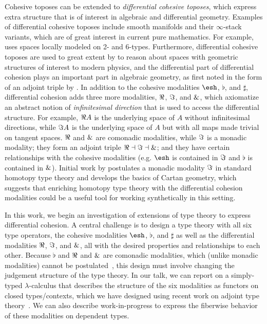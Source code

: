 \documentclass{article}
\begin{document}
Cohesive toposes can be extended to \emph{differential cohesive
  toposes}, which express extra structure that is of interest in
algebraic and differential geometry.  Examples of differential cohesive
toposes include smooth manifolds and their $\infty$-stack variants,
which are of great interest in current pure mathematics. For example,
\citet{SatiSchreiberStasheff2012} uses spaces locally modeled on 2- and
6-types.  Furthermore, differential cohesive toposes are used to great
extent by \citet{Schreiber2013} to reason about spaces with geometric
structures of interest to modern physics, and the differential part of
differential cohesion plays an important part in algebraic geometry, as
first noted in the form of an adjoint triple by \citet{SimpsonTeleman}.
In addition to the cohesive modalities $\shape$, $\flat$, and $\sharp$,
differential cohesion adds three more modalities, $\Re$, $\Im$, and
$\&$, which axiomatize an abstract notion of \emph{infinitesimal
  direction} that is used to access the differential structure.  For
example, $\Re A$ is the underlying space of $A$ without infinitesimal
directions, while $\Im A$ is the underlying space of $A$ but with all
maps made trivial on tangent spaces.  $\Re$ and $\&$ are comonadic
modalities, while $\Im$ is a monadic modality; they form an adjoint
triple $\Re \dashv \Im \dashv \&$; and they have certain
relationships with the cohesive modalities (e.g. $\shape$ is contained
in $\Im$ and $\flat$ is contained in $\&$).  Initial work by
\citet{Wellen2017} postulates a monadic modality $\Im$ in standard
homotopy type theory and develops the basics of Cartan geometry, which
suggests that enriching homotopy type theory with the differential
cohesion modalities could be a useful tool for working synthetically in
this setting.
 

In this work, we begin an investigation of extensions of type theory to
express differential cohesion.  A central challenge is to design a type
theory with all six type operators, the cohesive modalities $\shape$,
$\flat$, and $\sharp$ as well as the differential modalities $\Re$,
$\Im$, and $\&$, all with the desired properties and relationships
to each other.  Because $\flat$ and $\Re$ and $\&$ are comonadic
modalities, which (unlike monadic modalities) cannot be
postulated~\citep{Shulman2015}, this design must involve changing the
judgement structure of the type theory.  In our talk, we can report on a
simply-typed $\lambda$-calculus that describes the structure of the six
modalities as functors on closed types/contexts, which we have designed
using recent work on adjoint type theory~\citep{Licata2017}.  We can
also describe work-in-progress to express the fiberwise behavior of
these modalities on dependent types.
\end{document}
